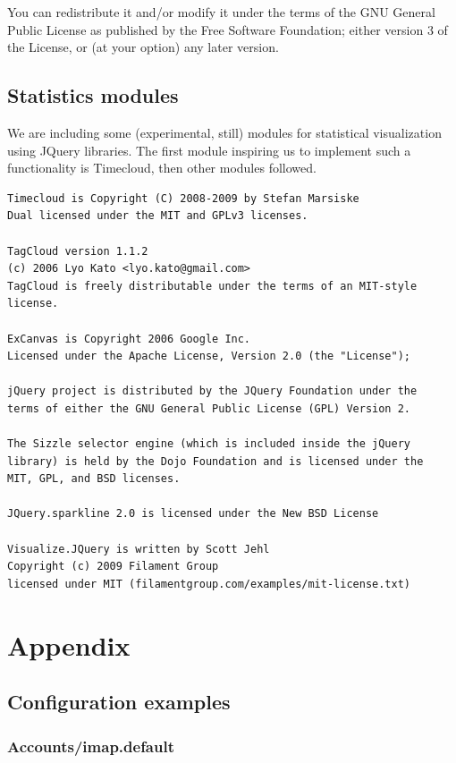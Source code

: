 \documentclass[a4,onecolumn,portrait]{article}
\begin{document}
You can redistribute it and/or modify it under the terms of the GNU
General Public License as published by the Free Software Foundation;
either version 3 of the License, or (at your option) any later
version.
\subsection{Statistics modules}
\label{sec-11-7}
We are including some (experimental, still) modules for statistical
visualization using JQuery libraries. The first module inspiring us
to implement such a functionality is Timecloud, then other modules
followed.

\begin{verbatim}
Timecloud is Copyright (C) 2008-2009 by Stefan Marsiske
Dual licensed under the MIT and GPLv3 licenses.

TagCloud version 1.1.2
(c) 2006 Lyo Kato <lyo.kato@gmail.com>
TagCloud is freely distributable under the terms of an MIT-style license.

ExCanvas is Copyright 2006 Google Inc.
Licensed under the Apache License, Version 2.0 (the "License");

jQuery project is distributed by the JQuery Foundation under the
terms of either the GNU General Public License (GPL) Version 2.

The Sizzle selector engine (which is included inside the jQuery
library) is held by the Dojo Foundation and is licensed under the
MIT, GPL, and BSD licenses.

JQuery.sparkline 2.0 is licensed under the New BSD License

Visualize.JQuery is written by Scott Jehl
Copyright (c) 2009 Filament Group
licensed under MIT (filamentgroup.com/examples/mit-license.txt)
\end{verbatim}

\section{Appendix}
\label{sec-12}

\subsection{Configuration examples}
\label{sec-12-1}

\subsubsection{Accounts/imap.default}
\label{sec-12-1-1}
\end{document}
